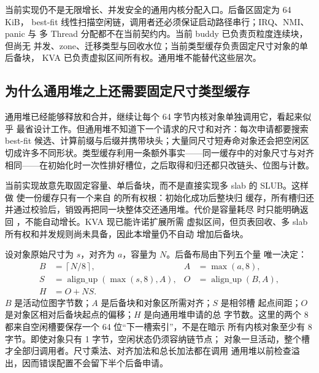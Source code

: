 当前实现仍不是无限增长、并发安全的通用内核分配入口。后备区固定为 64 KiB，
best-fit 线性扫描空闲链，调用者还必须保证启动路径串行；IRQ、NMI、panic 与
多 Thread 分配都不在当前契约内。当前 buddy 已负责页粒度连续块，但尚无
并发、zone、迁移类型与回收水位；当前类型缓存负责固定尺寸对象的单后备块，
KVA 已负责虚拟区间所有权。通用堆不能替代这些层次。

\subsection{为什么通用堆之上还需要固定尺寸类型缓存}

通用堆已经能够释放和合并，继续让每个 64 字节内核对象单独调用它，看起来似乎
最省设计工作。但通用堆不知道下一个请求的尺寸和对齐：每次申请都要搜索
best-fit 候选、计算前缀与后缀并携带块头；大量同尺寸短寿命对象还会把空闲区
切成许多不同形状。类型缓存利用一条额外事实——同一缓存中的对象尺寸与对齐
相同——在初始化时一次性排好槽位，之后取得和归还都只改链头、位图与计数。

当前实现故意先取固定容量、单后备块，而不是直接实现多 slab 的 SLUB。这样做
使一份缓存只有一个来自  的所有权根：初始化成功后整块归
缓存，所有槽归还并通过校验后，销毁再把同一块整体交还通用堆。代价是容量耗尽
时只能明确返回 ，不能自动增长。KVA 现已能许诺扩展所需
虚拟区间，但页表回收、多 slab 所有权和并发规则尚未具备，因此本增量仍不自动
增加后备块。

设对象原始尺寸为 \(s\)，对齐为 \(a\)，容量为 \(N\)。后备布局由下列五个量
唯一决定：
\[
\begin{aligned}
  B &= \left\lceil N/8 \right\rceil, &
  A &= \max(a,8),\\
  S &= \operatorname{align\_up}\!\left(\max(s,8),A\right), &
  O &= \operatorname{align\_up}(B,A),\\
  H &= O+N S.
\end{aligned}
\]
\(B\) 是活动位图字节数；\(A\) 是后备块和对象区所需对齐；\(S\) 是相邻槽
起点间距；\(O\) 是对象区相对后备块起点的偏移；\(H\) 是向通用堆申请的总
字节数。这里的两个 8 都来自空闲槽要保存一个 64 位“下一槽索引”，不是在暗示
所有内核对象至少有 8 字节。即使对象只有 1 字节，空闲状态仍须容纳链节点；
对象一旦活动，整个槽才全部归调用者。尺寸乘法、对齐加法和总长加法都在调用
通用堆以前检查溢出，因而错误配置不会留下半个后备申请。

